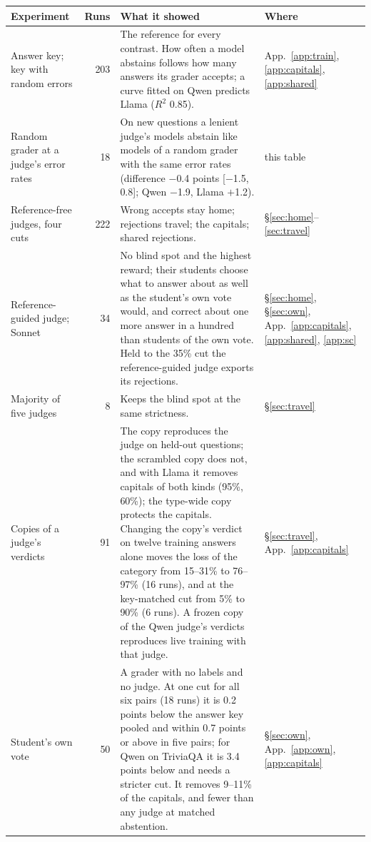 \documentclass[11pt,a4paper,twocolumn]{article}
\begin{document}
\begin{table}[p]
\footnotesize
\centering
\begin{tabular}{@{}p{}rp{}p{}@{}}
\toprule
Experiment & Runs & What it showed & Where \\
\midrule
Answer key; key with random errors & 203 & The reference for every contrast. How often a model abstains follows how many answers its grader accepts; a curve fitted on Qwen predicts Llama ($R^2$ 0.85). & App.~\ref{app:train}, \ref{app:capitals}, \ref{app:shared} \\
Random grader at a judge's error rates & 18 & On new questions a lenient judge's models abstain like models of a random grader with the same error rates (difference $-$0.4 points [$-$1.5, 0.8]; Qwen $-$1.9, Llama $+$1.2). & this table \\
Reference-free judges, four cuts & 222 & Wrong accepts stay home; rejections travel; the capitals; shared rejections. & \S\ref{sec:home}--\ref{sec:travel} \\
Reference-guided judge; Sonnet & 34 & No blind spot and the highest reward; their students choose what to answer about as well as the student's own vote would, and correct about one more answer in a hundred than students of the own vote. Held to the 35\% cut the reference-guided judge exports its rejections. & \S\ref{sec:home}, \S\ref{sec:own}, App.~\ref{app:capitals}, \ref{app:shared}, \ref{app:sc} \\
Majority of five judges & 8 & Keeps the blind spot at the same strictness. & \S\ref{sec:travel} \\
Copies of a judge's verdicts & 91 & The copy reproduces the judge on held-out questions; the scrambled copy does not, and with Llama it removes capitals of both kinds (95\%, 60\%); the type-wide copy protects the capitals. Changing the copy's verdict on twelve training answers alone moves the loss of the category from 15--31\% to 76--97\% (16 runs), and at the key-matched cut from 5\% to 90\% (6 runs). A frozen copy of the Qwen judge's verdicts reproduces live training with that judge. & \S\ref{sec:travel}, App.~\ref{app:capitals} \\
Student's own vote & 50 & A grader with no labels and no judge. At one cut for all six pairs (18 runs) it is 0.2 points below the answer key pooled and within 0.7 points or above in five pairs; for Qwen on TriviaQA it is 3.4 points below and needs a stricter cut. It removes 9--11\% of the capitals, and fewer than any judge at matched abstention. & \S\ref{sec:own}, App.~\ref{app:own}, \ref{app:capitals} \\

\end{tabular}
\end{table}
\end{document}
